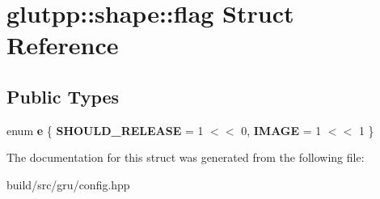 \hypertarget{structglutpp_1_1shape_1_1flag}{\section{glutpp\-:\-:shape\-:\-:flag \-Struct \-Reference}
\label{structglutpp_1_1shape_1_1flag}
}
\subsection*{\-Public \-Types}
\begin{DoxyCompactItemize}
\item 
enum {\bfseries e} \{ {\bfseries \-S\-H\-O\-U\-L\-D\-\_\-\-R\-E\-L\-E\-A\-S\-E} =  1 $<$$<$ 0, 
{\bfseries \-I\-M\-A\-G\-E} =  1 $<$$<$ 1
 \}
\end{DoxyCompactItemize}


\-The documentation for this struct was generated from the following file\-:\begin{DoxyCompactItemize}
\item 
build/src/gru/config.\-hpp\end{DoxyCompactItemize}

